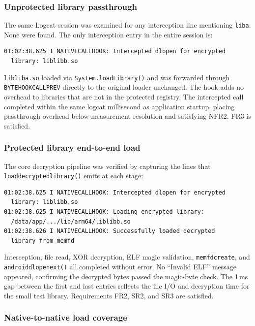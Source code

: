 \documentclass[11pt,a4paper]{report}
\renewcommand\_{{\textunderscore\allowbreak}}
\begin{document}
\subsubsection{Unprotected library passthrough}

The same Logcat session was examined for any interception line mentioning \texttt{liba}. None were found. The only interception entry in the entire session is:

\begin{verbatim}
01:02:38.625 I NATIVECALLHOOK: Intercepted dlopen for encrypted
  library: liblibb.so
\end{verbatim}

\texttt{libliba.so} loaded via \texttt{System.loadLibrary()} and was forwarded through \texttt{BYTEHOOK\_CALL\_\allowbreak PREV} directly to the original loader unchanged. The hook adds no overhead to libraries that are not in the protected registry. The intercepted call completed within the same logcat millisecond as application startup, placing passthrough overhead below measurement resolution and satisfying NFR2. FR3 is satisfied.

\subsubsection{Protected library end-to-end load}

The core decryption pipeline was verified by capturing the lines that \texttt{load\_decrypted\_library()} emits at each stage:

\begin{verbatim}
01:02:38.625 I NATIVECALLHOOK: Intercepted dlopen for encrypted
  library: liblibb.so
01:02:38.625 I NATIVECALLHOOK: Loading encrypted library:
  /data/app/.../lib/arm64/liblibb.so
01:02:38.626 I NATIVECALLHOOK: Successfully loaded decrypted
  library from memfd
\end{verbatim}

Interception, file read, XOR decryption, ELF magic validation, \texttt{memfd\_create}, and \texttt{android\_dlopen\_\allowbreak ext()} all completed without error. No ``Invalid ELF'' message appeared, confirming the decrypted bytes passed the magic-byte check. The 1\,ms gap between the first and last entries reflects the file I/O and decryption time for the small test library. Requirements FR2, SR2, and SR3 are satisfied.

\subsubsection{Native-to-native load coverage}
\end{document}
